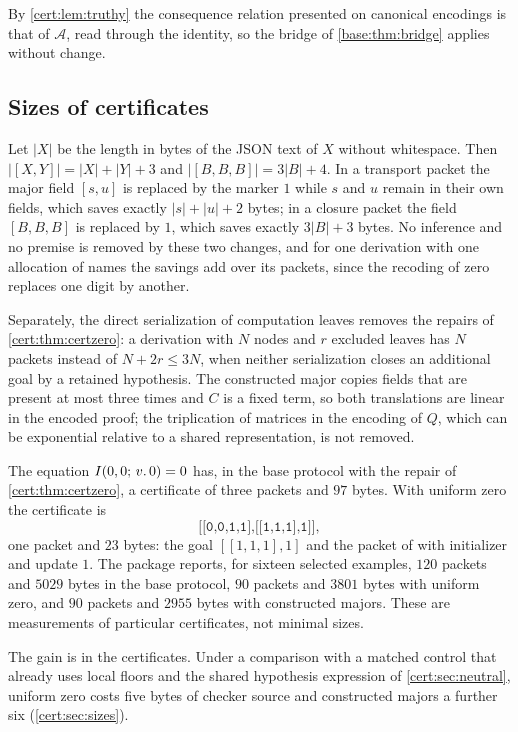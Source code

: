 By \cref{cert:lem:truthy} the consequence relation presented on canonical
encodings is that of $\mathcal A$, read through the identity, so the bridge
of \cref{base:thm:bridge} applies without change.

\subsection{Sizes of certificates}

Let $\lvert X\rvert$ be the length in bytes of the JSON text of $X$ without
whitespace. Then $\lvert[X,Y]\rvert=\lvert X\rvert+\lvert Y\rvert+3$ and
$\lvert[B,B,B]\rvert=3\lvert B\rvert+4$. In a transport packet the major field
$[s,u]$ is replaced by the marker $1$ while $s$ and $u$ remain in their own
fields, which saves exactly $\lvert s\rvert+\lvert u\rvert+2$ bytes; in a
closure packet the field $[B,B,B]$ is replaced by $1$, which saves exactly
$3\lvert B\rvert+3$ bytes. No inference and no premise is removed by these
two changes, and for one derivation with one allocation of names the savings
add over its packets, since the recoding of zero replaces one digit by
another.

Separately, the direct serialization of computation leaves removes the
repairs of \cref{cert:thm:certzero}: a derivation with $N$ nodes and $r$
excluded leaves has $N$ packets instead of $N+2r\le 3N$, when neither
serialization closes an additional goal by a retained hypothesis. The
constructed major copies fields that are present at most three times and $C$
is a fixed term, so both translations are linear in the encoded proof; the
triplication of matrices in the encoding of $Q$, which can be exponential
relative to a shared representation, is not removed.

\begin{example}
The equation $I(0,0;\,v.\,0)=0$ has, in the base protocol with the repair of
\cref{cert:thm:certzero}, a certificate of three packets and $97$ bytes. With
uniform zero the certificate is
\[
\texttt{[[0,0,1,1],[[1,1,1],1]]},
\]
one packet and $23$ bytes: the goal $[[1,1,1],1]$ and the packet of
 with initializer and update $1$. The package reports, for sixteen
selected examples, $120$ packets and $5029$ bytes in the base protocol, $90$
packets and $3801$ bytes with uniform zero, and $90$ packets and $2955$ bytes
with constructed majors. These are measurements of particular certificates,
not minimal sizes.
\end{example}

The gain is in the certificates. Under a comparison with a matched control
that already uses local floors and the shared hypothesis expression of
\cref{cert:sec:neutral}, uniform zero costs five bytes of checker source and
constructed majors a further six (\cref{cert:sec:sizes}).

